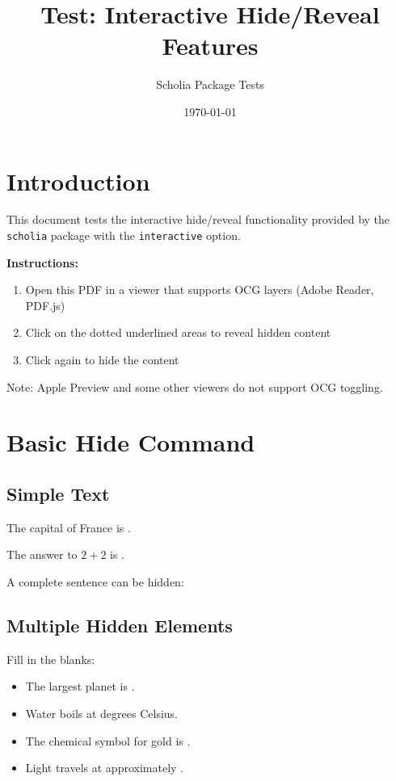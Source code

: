 \documentclass[11pt,a4paper]{article}
\title{Test: Interactive Hide/Reveal Features}
\author{Scholia Package Tests}
\date{\today}
\begin{document}
\maketitle

\section{Introduction}

This document tests the interactive hide/reveal functionality provided by the
\texttt{scholia} package with the \texttt{interactive} option.

\textbf{Instructions:}
\begin{enumerate}
  \item Open this PDF in a viewer that supports OCG layers (Adobe Reader, PDF.js)
  \item Click on the dotted underlined areas to reveal hidden content
  \item Click again to hide the content
\end{enumerate}

Note: Apple Preview and some other viewers do not support OCG toggling.

\section{Basic Hide Command}

\subsection{Simple Text}

The capital of France is .

The answer to $2 + 2$ is .

A complete sentence can be hidden: 

\subsection{Multiple Hidden Elements}

Fill in the blanks:
\begin{itemize}
  \item The largest planet is .
  \item Water boils at  degrees Celsius.
  \item The chemical symbol for gold is .
  \item Light travels at approximately .
\end{itemize}
\end{document}
